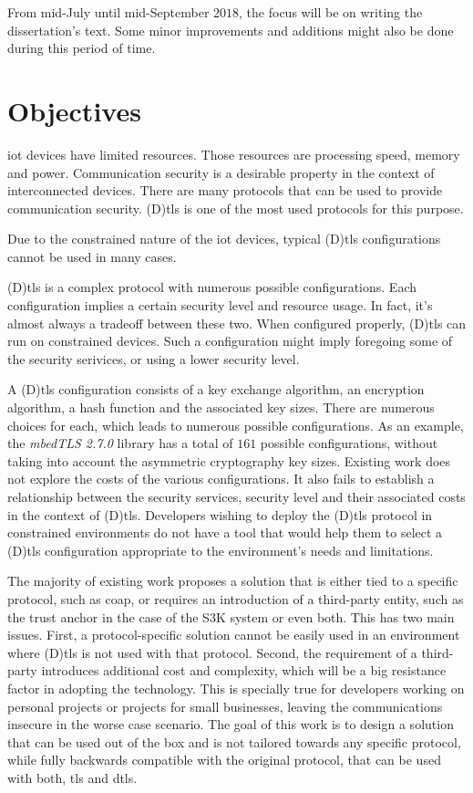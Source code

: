 \documentclass{llncs}
\begin{document}
From mid-July until mid-September $2018$, the focus will be on writing the
dissertation's text. Some minor improvements and additions might also be done
during this period of time.

\section{Objectives}

\gls{iot} devices have limited resources. Those resources are processing speed, memory and power.
Communication security is a desirable property in the context of interconnected devices.
There are many protocols that can be used to provide communication security. (D)\gls{tls} is one
of the most used protocols for this purpose.

Due to the constrained nature of the \gls{iot} devices, typical (D)\gls{tls} configurations cannot be
used in many cases.

(D)\gls{tls} is a complex protocol with numerous possible configurations. Each configuration
implies a certain security level and resource usage. In fact, it's almost always a tradeoff
between these two. When configured properly, (D)\gls{tls} can run on constrained devices.
Such a configuration might imply foregoing some of the security serivices, or using a lower
security level.

A (D)\gls{tls} configuration consists of a key exchange algorithm, an encryption algorithm,
a hash function and the associated key sizes. There are numerous choices for each, which leads to
numerous possible configurations. As an example, the \textit{mbedTLS 2.7.0} library has a total
of $161$ possible configurations, without taking into account the asymmetric cryptography key sizes.
Existing work does not explore the costs of the various configurations. It also fails to 
establish a relationship between the security services, security level and their associated
costs in the context of (D)\gls{tls}. Developers wishing to deploy the (D)\gls{tls} protocol
in constrained environments do not have a tool that would help them to select a (D)\gls{tls}
configuration appropriate to the environment's needs and limitations.

The majority of existing work proposes a solution that is either tied to a
specific protocol, such as \gls{coap}, or requires an introduction of a third-party
entity, such as the trust anchor in the case of the S3K system\cite{S3KScala62:online} or
even both. This has two main issues. First, a protocol-specific solution cannot
be easily used in an environment where (D)\gls{tls} is not used with that protocol. 
Second, the requirement of a third-party
introduces additional cost and complexity, which will be a big resistance factor
in adopting the technology. This is specially true for developers working on
personal projects or projects for small businesses, leaving the communications insecure
in the worse case scenario. The goal of this work is to design a solution that can be used out
of the box and is not tailored towards any specific protocol, while fully backwards
compatible with the original protocol, that can be used with both, \gls{tls}
and \gls{dtls}.
\end{document}
